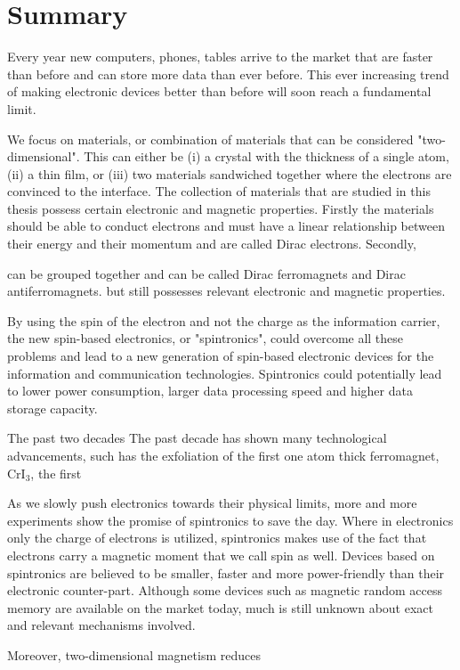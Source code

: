 \manualmark
{}%
%
%
\chapter*{Summary}%
Every year new computers, phones, tables arrive to the market that are faster than before and can store more data than ever before. This ever increasing trend of making electronic devices better than before will soon reach a fundamental limit. 

We focus on materials, or combination of materials that can be considered "two-dimensional". This can either be (i) a crystal with the thickness of a single atom, (ii) a thin film, or (iii) two materials sandwiched together where the electrons are convinced to the interface. The collection of materials that are studied in this thesis possess certain electronic and magnetic properties. Firstly the materials should be able to conduct electrons and must have a linear relationship between their energy and their momentum and are called Dirac electrons. Secondly, 


can be grouped together and can be called Dirac ferromagnets and Dirac antiferromagnets. but still possesses relevant electronic and magnetic properties. 

By using the spin of the electron and not the charge as the information carrier, the new spin-based electronics, or "spintronics", could overcome all these problems and lead to a new generation of spin-based electronic devices for the information and communication technologies. Spintronics could potentially lead to lower power consumption, larger data processing speed and higher data storage capacity. 

The past two decades 
The past decade has shown many technological advancements, such has the exfoliation of the first one atom thick ferromagnet, CrI$_3$, the first  

As we slowly push electronics towards their  physical limits, more and more experiments show the promise of spintronics to save the day. Where in electronics only the charge of electrons is utilized, spintronics makes use of the fact that electrons carry a magnetic moment that we call spin as well. Devices based on spintronics are believed to be smaller, faster and more power-friendly than their electronic counter-part. Although some devices such as magnetic random access memory are available on the market today, much is still unknown about exact and relevant mechanisms involved. 

Moreover, two-dimensional magnetism reduces 
